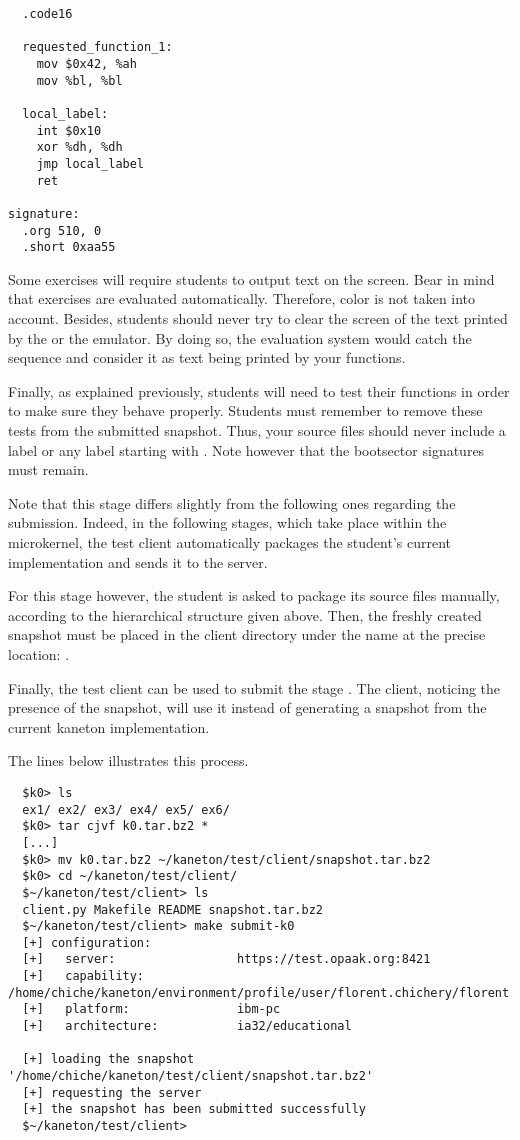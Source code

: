 \begin{verbatim}
  .code16

  requested_function_1:
    mov $0x42, %ah
    mov %bl, %bl

  local_label:
    int $0x10
    xor %dh, %dh
    jmp local_label
    ret

signature:
  .org 510, 0
  .short 0xaa55
\end{verbatim}

Some exercises will require students to output text on the screen. Bear in
mind that exercises are evaluated automatically. Therefore, color is not
taken into account. Besides, students should never try to clear the screen
of the text printed by the  or the emulator. By doing so, the
evaluation system would catch the sequence and consider it as text being
printed by your functions.

Finally, as explained previously, students will need to test their functions
in order to make sure they behave properly. Students must remember to remove
these tests from the submitted snapshot. Thus, your source files should never
include a label  or any label starting with \code{\_\_}. Note
however that the bootsector signatures must remain.

Note that this stage differs slightly from the following ones regarding
the submission. Indeed, in the following stages, which take place within the
microkernel, the test client automatically packages the student's current
implementation and sends it to the server.

For this stage however, the student is asked to package its source files
manually, according to the hierarchical structure given above. Then,
the freshly created snapshot must be placed in the client directory
under the name  \ie{} at the precise location:
.

Finally, the test client can be used to submit the stage . The
client, noticing the presence of the snapshot, will use it instead of
generating a snapshot from the current kaneton implementation.

The lines below illustrates this process.

\begin{verbatim}
  $k0> ls
  ex1/ ex2/ ex3/ ex4/ ex5/ ex6/
  $k0> tar cjvf k0.tar.bz2 *
  [...]
  $k0> mv k0.tar.bz2 ~/kaneton/test/client/snapshot.tar.bz2
  $k0> cd ~/kaneton/test/client/
  $~/kaneton/test/client> ls
  client.py Makefile README snapshot.tar.bz2
  $~/kaneton/test/client> make submit-k0
  [+] configuration:
  [+]   server:                 https://test.opaak.org:8421
  [+]   capability:             /home/chiche/kaneton/environment/profile/user/florent.chichery/florent.chichery.cap
  [+]   platform:               ibm-pc
  [+]   architecture:           ia32/educational

  [+] loading the snapshot '/home/chiche/kaneton/test/client/snapshot.tar.bz2'
  [+] requesting the server
  [+] the snapshot has been submitted successfully
  $~/kaneton/test/client>
\end{verbatim}

